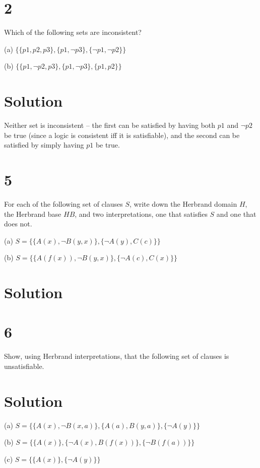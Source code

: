\documentclass[10pt]{article}
\begin{document}
\section*{2}
Which of the following sets are inconsistent?
\begin{description*}
\item[(a)] $\{ \{ p1, p2, p3\}, \{ p1, \lnot p3\}, \{ \lnot p1, \lnot p2 \} \}$
\item[(b)] $\{ \{ p1, \lnot p2, p3\}, \{ p1, \lnot p3 \}, \{ p1, p2 \} \}$
\end{description*}

\section*{Solution}
Neither set is inconsistent -- the first can be satisfied by having both $p1$ and $\lnot p2$ be true (since a logic is consistent iff it is satisfiable), and the second can be satisfied by simply having $p1$ be true.

\section*{5}
For each of the following set of clauses $S$, write down the Herbrand domain $H$, the Herbrand base $HB$, and two interpretations, one that satisfies $S$ and one that does not.
\begin{description*}
\item[(a)] $S = \{ \{ A(x), \lnot B(y,x) \}, \{ \lnot A(y), C(c) \} \}$
\item[(b)] $S = \{ \{ A(f(x)), \lnot B(y,x)\}, \{ \lnot A(c),C(x) \} \}$
\end{description*}
\section*{Solution}


\section*{6}
Show, using Herbrand interpretations, that the following set of clauses is unsatisfiable.

\section*{Solution} 
\begin{description*}
\item[(a)] $S = \{ \{ A(x), \lnot B(x,a) \}, \{ A(a), B(y,a) \}, \{ \lnot A(y) \} \}$
\item[(b)] $S = \{ \{ A(x)\}, \{ \lnot A(x), B(f(x)) \}, \{ \lnot B(f(a)) \} \}$
\item[(c)] $S = \{ \{ A(x) \}, \{ \lnot A(y) \} \}$
\end{description*}
\end{document}
